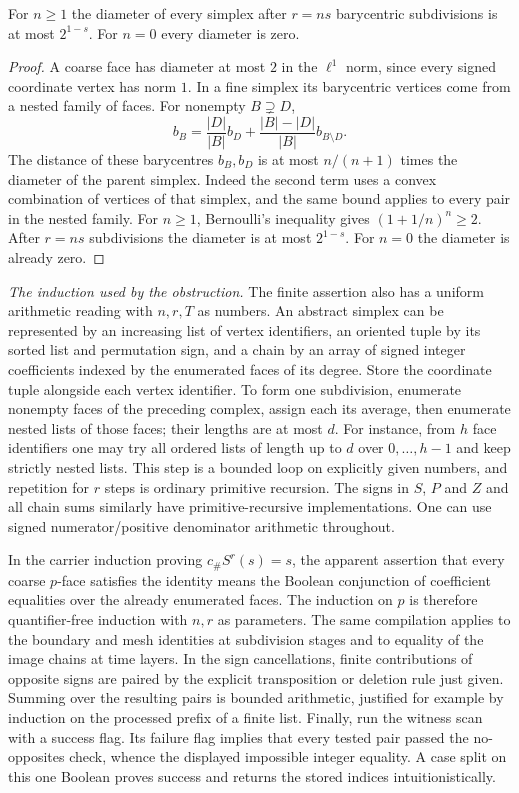 \begin{lemma}\label{lem:mesh}
For $n\geq1$ the diameter of every simplex after $r=ns$ barycentric
subdivisions is at most $2^{1-s}$. For $n=0$ every diameter is zero.
\end{lemma}
\begin{proof}
A coarse face has diameter at most $2$ in the $\ell^1$ norm, since
every signed coordinate vertex has norm $1$. In a fine
simplex its barycentric vertices come from a nested family of faces.
For nonempty $B\supsetneq D$,
\[
 b_B=\frac{|D|}{|B|}b_D+
       \frac{|B|-|D|}{|B|}b_{B\setminus D}.
\]
The distance of these barycentres $b_B,b_D$ is at most
$n/(n+1)$ times the diameter of the parent simplex. Indeed the
second term uses a convex combination of vertices of that simplex,
and the same bound applies to every pair in the nested family.
For $n\geq1$, Bernoulli's inequality gives
$(1+1/n)^n\geq2$. After $r=ns$ subdivisions the diameter is at
most $2^{1-s}$. For $n=0$ the diameter is already zero.
\end{proof}

\par\smallskip\noindent\textit{The induction used by the obstruction.}\enspace
The finite assertion also has a uniform arithmetic reading with $n,r,T$
as numbers. An abstract simplex can be represented by an increasing list
of vertex identifiers, an oriented tuple by its sorted list and permutation
sign, and a chain by an array of signed integer coefficients indexed by
the enumerated faces of its degree. Store the coordinate tuple alongside
each vertex identifier. To form one subdivision, enumerate nonempty faces
of the preceding complex, assign each its average, then enumerate nested
lists of those faces; their lengths are at most $d$. For instance, from
$h$ face identifiers one may try all ordered lists of length up to $d$
over $0,\ldots,h-1$ and keep strictly nested lists. This step is a
bounded loop on explicitly given numbers, and repetition for $r$ steps
is ordinary primitive recursion. The signs in $S$, $P$ and $Z$ and all
chain sums similarly have primitive-recursive implementations. One can
use signed numerator/positive denominator arithmetic throughout.

In the carrier induction proving $c_\# S^r(s)=s$, the apparent assertion
that every coarse $p$-face satisfies the identity means the Boolean
conjunction of coefficient equalities over the already enumerated faces.
The induction on $p$ is therefore quantifier-free induction with $n,r$
as parameters. The same compilation applies to the boundary and mesh
identities at subdivision stages and to equality of the image chains at
time layers. In the sign cancellations, finite contributions of opposite
signs are paired by the explicit transposition or deletion rule just given.
Summing over the resulting pairs is bounded arithmetic, justified for
example by induction on the processed prefix of a finite list. Finally,
run the witness scan with a success flag. Its failure flag implies that
every tested pair passed the no-opposites check, whence the displayed
impossible integer equality. A case split on this one Boolean proves
success and returns the stored indices intuitionistically.
